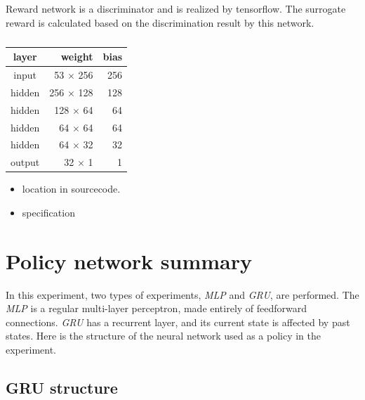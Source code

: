 Reward network is a discriminator and is realized by tensorflow. The surrogate reward is calculated based on the discrimination result by this network.

\begin{table}[H]
\centering
\begin{tabular}{|c|r|r|}
\hline 
layer  & weight   & bias \\ \hline \hline
input  & 53 $\times$ 256 & 256  \\
hidden & 256 $\times$ 128 & 128 \\ 
hidden & 128 $\times$ 64 & 64 \\ 
hidden & 64 $\times$ 64 & 64 \\ 
hidden & 64 $\times$ 32 & 32 \\ 
output & 32 $\times$ 1 & 1 \\ 
\hline
\end{tabular} 
\caption{}
\label{tab:reward_network}
\end{table}


\begin{itemize}
\item location in sourcecode.
\item specification
\end{itemize}


\section{Policy network summary}

In this experiment, two types of experiments, {\it MLP} and {\it GRU}, are performed. The {\it MLP} is a regular multi-layer perceptron, made entirely of feedforward connections. {\it GRU} has a recurrent layer, and its current state is affected by past states. Here is the structure of the neural network used as a policy in the experiment.





\subsection{GRU structure}


